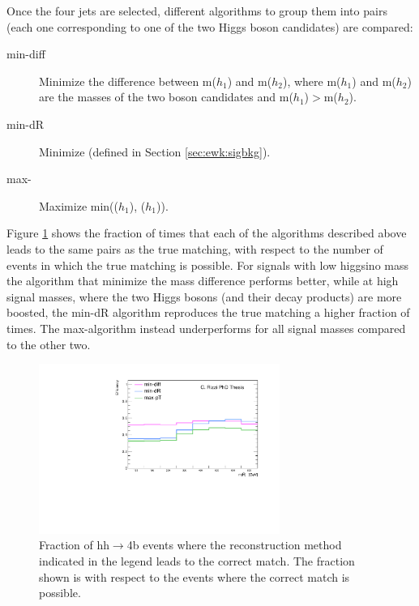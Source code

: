 Once the four jets are selected, 
different algorithms to group them into pairs (each one corresponding to one of the two Higgs boson candidates) 
are compared: 

\begin{description}
\item[min-diff] Minimize the difference between m($h_1$)  and m($h_2$), where m($h_1$) and m($h_2$) are the masses of the two boson candidates and 
m($h_1$)$>$m($h_2$).
\item[min-dR] Minimize \dRmax (defined in Section \ref{sec:ewk:sigbkg}).
\item[max-\pt] Maximize min(\pt($h_1$), \pt($h_1$)).
\end{description}


Figure \ref{fig:h_reco_best_match} shows the fraction of times that each of the algorithms 
described above leads to the same pairs as the true matching, with respect to the number of events in which the true matching is possible. 
For signals with low higgsino mass the algorithm that minimize the mass difference performs better, 
while at high signal masses, where the two Higgs bosons (and their decay products) are more boosted, 
the min-dR algorithm reproduces the true matching a higher fraction of times. 
The max-\pt algorithm instead underperforms for all signal masses compared to the other 
two. 

\begin{figure}[h]
\centering
\includegraphics[width=0.7\textwidth]{figures/h_reco/best_match_if_match_possible.pdf}
\caption{Fraction of hh$\to$4b events where the reconstruction method indicated in the legend leads to the correct match. The fraction shown is with respect to the events where the correct match is possible.}
\label{fig:h_reco_best_match}
\end{figure}

